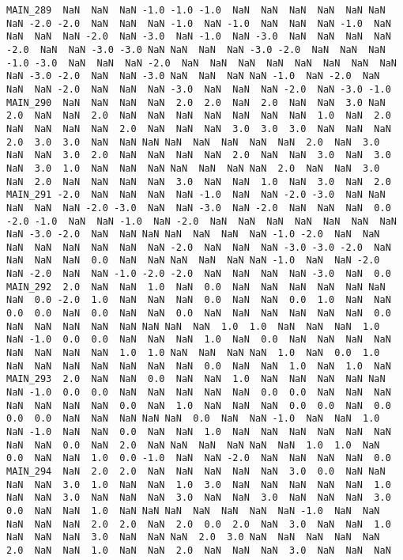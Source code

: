 \documentclass[a4paper,10pt,onecolumn,oneside,openright]{article}
\begin{document}
\begin{verbatim}
MAIN_289  NaN  NaN  NaN -1.0 -1.0 -1.0  NaN  NaN  NaN  NaN  NaN NaN  NaN -2.0 -2.0  NaN  NaN  NaN -1.0  NaN -1.0  NaN  NaN  NaN -1.0  NaN  NaN  NaN  NaN -2.0  NaN -3.0  NaN -1.0  NaN -3.0  NaN  NaN  NaN  NaN -2.0  NaN  NaN -3.0 -3.0 NaN NaN  NaN  NaN -3.0 -2.0  NaN  NaN  NaN -1.0 -3.0  NaN  NaN  NaN -2.0  NaN  NaN  NaN  NaN  NaN  NaN  NaN  NaN NaN -3.0 -2.0  NaN  NaN -3.0 NaN  NaN  NaN NaN -1.0  NaN -2.0  NaN  NaN  NaN -2.0  NaN  NaN  NaN -3.0  NaN  NaN  NaN -2.0  NaN -3.0 -1.0
MAIN_290  NaN  NaN  NaN  NaN  2.0  2.0  NaN  2.0  NaN  NaN  3.0 NaN  2.0  NaN  NaN  2.0  NaN  NaN  NaN  NaN  NaN  NaN  NaN  1.0  NaN  2.0  NaN  NaN  NaN  NaN  2.0  NaN  NaN  NaN  3.0  3.0  3.0  NaN  NaN  NaN  2.0  3.0  3.0  NaN  NaN NaN NaN  NaN  NaN  NaN  NaN  2.0  NaN  3.0  NaN  NaN  3.0  2.0  NaN  NaN  NaN  NaN  2.0  NaN  NaN  3.0  NaN  3.0 NaN  3.0  1.0  NaN  NaN  NaN NaN  NaN  NaN NaN  2.0  NaN  NaN  3.0  NaN  2.0  NaN  NaN  NaN  NaN  3.0  NaN  NaN  1.0  NaN  3.0  NaN  2.0
MAIN_291 -2.0  NaN  NaN  NaN  NaN -1.0  NaN  NaN -2.0 -3.0  NaN NaN  NaN  NaN  NaN -2.0 -3.0  NaN  NaN -3.0  NaN -2.0  NaN  NaN  NaN  0.0 -2.0 -1.0  NaN  NaN -1.0  NaN -2.0  NaN  NaN  NaN  NaN  NaN  NaN  NaN  NaN -3.0 -2.0  NaN  NaN NaN NaN  NaN  NaN  NaN -1.0 -2.0  NaN  NaN  NaN  NaN  NaN  NaN  NaN  NaN -2.0  NaN  NaN  NaN -3.0 -3.0 -2.0  NaN NaN  NaN  NaN  0.0  NaN  NaN NaN  NaN  NaN NaN -1.0  NaN  NaN -2.0  NaN -2.0  NaN  NaN -1.0 -2.0 -2.0  NaN  NaN  NaN  NaN -3.0  NaN  0.0
MAIN_292  2.0  NaN  NaN  1.0  NaN  0.0  NaN  NaN  NaN  NaN  NaN NaN  NaN  0.0 -2.0  1.0  NaN  NaN  NaN  0.0  NaN  NaN  0.0  1.0  NaN  NaN  0.0  0.0  NaN  0.0  NaN  NaN  0.0  NaN  NaN  NaN  NaN  NaN  NaN  0.0  NaN  NaN  NaN  NaN  NaN NaN NaN  NaN  1.0  1.0  NaN  NaN  NaN  1.0  NaN -1.0  0.0  0.0  NaN  NaN  NaN  1.0  NaN  0.0  NaN  NaN  NaN  NaN NaN  NaN  NaN  NaN  1.0  1.0 NaN  NaN  NaN NaN  1.0  NaN  0.0  1.0  NaN  NaN  NaN  NaN  NaN  NaN  NaN  0.0  NaN  NaN  1.0  NaN  1.0  NaN
MAIN_293  2.0  NaN  NaN  0.0  NaN  NaN  1.0  NaN  NaN  NaN  NaN NaN  NaN -1.0  0.0  0.0  NaN  NaN  NaN  NaN  NaN  0.0  0.0  NaN  NaN  NaN  NaN  NaN  NaN  NaN  0.0  NaN  1.0  NaN  NaN  NaN  0.0  0.0  NaN  0.0  0.0  0.0  NaN  NaN  NaN NaN NaN  0.0  NaN  NaN -1.0  NaN  NaN  1.0  NaN -1.0  NaN  NaN  0.0  NaN  NaN  1.0  NaN  NaN  NaN  NaN  NaN  NaN NaN  NaN  0.0  NaN  2.0  NaN NaN  NaN  NaN NaN  NaN  1.0  1.0  NaN  0.0  NaN  NaN  1.0  0.0 -1.0  NaN  NaN -2.0  NaN  NaN  NaN  NaN  0.0
MAIN_294  NaN  2.0  2.0  NaN  NaN  NaN  NaN  NaN  3.0  0.0  NaN NaN  NaN  NaN  3.0  1.0  NaN  NaN  1.0  3.0  NaN  NaN  NaN  NaN  NaN  1.0  NaN  NaN  3.0  NaN  NaN  NaN  3.0  NaN  NaN  3.0  NaN  NaN  NaN  3.0  0.0  NaN  NaN  1.0  NaN NaN NaN  NaN  NaN  NaN  NaN -1.0  NaN  NaN  NaN  NaN  NaN  2.0  2.0  NaN  2.0  0.0  2.0  NaN  3.0  NaN  NaN  1.0 NaN  NaN  NaN  3.0  NaN  NaN NaN  2.0  3.0 NaN  NaN  NaN  NaN  NaN  2.0  NaN  NaN  1.0  NaN  NaN  2.0  NaN  NaN  NaN  3.0  NaN  NaN  NaN

\end{verbatim}
\end{document}
